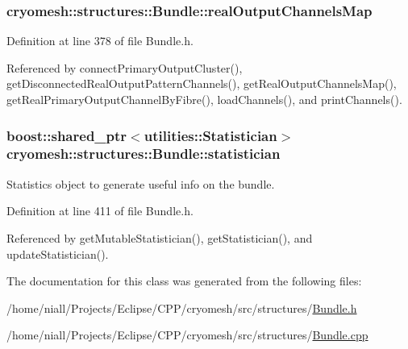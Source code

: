\hypertarget{classcryomesh_1_1structures_1_1Bundle_a4043d8bfeb8b066418029864f51d92de}{
\subsubsection[{real\-Output\-Channels\-Map}]{ {\bf cryomesh\-::structures\-::\-Bundle\-::real\-Output\-Channels\-Map}}}\label{classcryomesh_1_1structures_1_1Bundle_a4043d8bfeb8b066418029864f51d92de}


\-Definition at line 378 of file \-Bundle.\-h.



\-Referenced by connect\-Primary\-Output\-Cluster(), get\-Disconnected\-Real\-Output\-Pattern\-Channels(), get\-Real\-Output\-Channels\-Map(), get\-Real\-Primary\-Output\-Channel\-By\-Fibre(), load\-Channels(), and print\-Channels().

\hypertarget{classcryomesh_1_1structures_1_1Bundle_ad505cbda03b4e78399fd3a9568d79708}{
\subsubsection[{statistician}]{\setlength{\rightskip}{0pt plus 5cm}boost\-::shared\-\_\-ptr$<${\bf utilities\-::\-Statistician}$>$ {\bf cryomesh\-::structures\-::\-Bundle\-::statistician}}}\label{classcryomesh_1_1structures_1_1Bundle_ad505cbda03b4e78399fd3a9568d79708}


\-Statistics object to generate useful info on the bundle. 



\-Definition at line 411 of file \-Bundle.\-h.



\-Referenced by get\-Mutable\-Statistician(), get\-Statistician(), and update\-Statistician().



\-The documentation for this class was generated from the following files\-:\begin{DoxyCompactItemize}
\item 
/home/niall/\-Projects/\-Eclipse/\-C\-P\-P/cryomesh/src/structures/\hyperlink{Bundle_8h}{\-Bundle.\-h}\item 
/home/niall/\-Projects/\-Eclipse/\-C\-P\-P/cryomesh/src/structures/\hyperlink{Bundle_8cpp}{\-Bundle.\-cpp}\end{DoxyCompactItemize}
